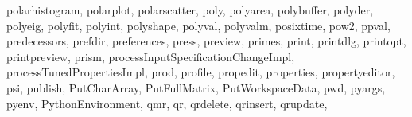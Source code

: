 {{        polarhistogram,%
        polarplot,%
        polarscatter,%
        poly,%
        polyarea,%
        polybuffer,%
        polyder,%
        polyeig,%
        polyfit,%
        polyint,%
        polyshape,%
        polyval,%
        polyvalm,%
        posixtime,%
        pow2,%
        ppval,%
        predecessors,%
        prefdir,%
        preferences,%
        press,%
        preview,%
        primes,%
        print,%
        printdlg,%
        printopt,%
        printpreview,%
        prism,%
        processInputSpecificationChangeImpl,%
        processTunedPropertiesImpl,%
        prod,%
        profile,%
        propedit,%
        properties,%
        propertyeditor,%
        psi,%
        publish,%
        PutCharArray,%
        PutFullMatrix,%
        PutWorkspaceData,%
        pwd,%
        pyargs,%
        pyenv,%
        PythonEnvironment,%
        qmr,%
        qr,%
        qrdelete,%
        qrinsert,%
        qrupdate,%
}}
